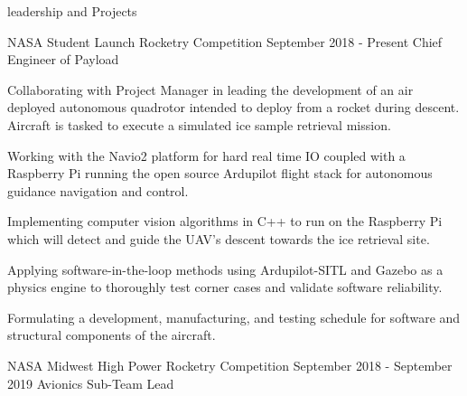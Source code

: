 \documentclass{resume} %
\begin{document}
    \begin{rSection} {leadership and Projects}

        \begin{rSubsection} {NASA Student Launch Rocketry Competition} {September 2018 - Present} {Chief Engineer of Payload}

            \item Collaborating with Project Manager in leading the development of an air deployed autonomous quadrotor intended to deploy from a rocket during descent. Aircraft is tasked to execute a simulated ice sample retrieval mission.
            \item Working with the Navio2 platform for hard real time IO coupled with a Raspberry Pi running the open source Ardupilot flight stack for autonomous guidance navigation and control.
            \item Implementing computer vision algorithms in C++ to run on the Raspberry Pi which will detect and guide the UAV's descent towards the ice retrieval site.
            \item Applying software-in-the-loop methods using Ardupilot-SITL and Gazebo as a physics engine to thoroughly test corner cases and validate software reliability.
            \item Formulating a development, manufacturing, and testing schedule for software and structural components of the aircraft.


        \end{rSubsection}



        \begin{rSubsection} {NASA Midwest High Power Rocketry Competition} {September 2018 - September 2019} {Avionics Sub-Team Lead}


\end{rSubsection}
\end{rSection}
\end{document}
